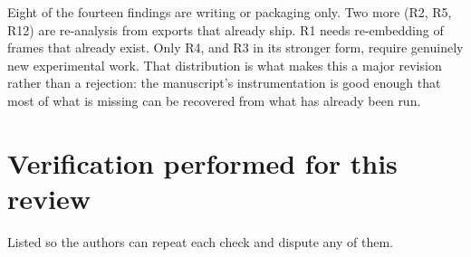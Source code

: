 \documentclass[11pt,a4paper]{article}
\begin{document}
Eight of the fourteen findings are writing or packaging only. Two more (R2, R5,
R12) are re-analysis from exports that already ship. R1 needs re-embedding of
frames that already exist. Only R4, and R3 in its stronger form, require
genuinely new experimental work. That distribution is what makes this a major
revision rather than a rejection: the manuscript's instrumentation is good
enough that most of what is missing can be recovered from what has already
been run.

\section{Verification performed for this review}
\label{sec:verification}

Listed so the authors can repeat each check and dispute any of them.
\end{document}
